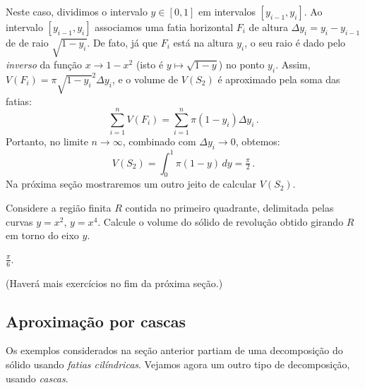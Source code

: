 \begin{ex}
\begin{center}
\begin{bmlimage}
\end{bmlimage}
\end{center}
Neste caso, dividimos o intervalo $y\in [0,1]$ em
intervalos $[y_{i-1},y_{i}]$. Ao intervalo $[y_{i-1},y_i]$ 
associamos uma fatia horizontal
$F_i$ de altura $\Delta y_i=y_i-y_{i-1}$ de
de raio $\sqrt{1-y_i}$. De fato, já que $F_i$ está na altura $y_i$, o
seu raio é dado pelo \emph{inverso} da função $x\to 1-x^2$
(isto é
$y\mapsto \sqrt{1-y}$) no ponto $y_i$. Assim, $V(F_i)=\pi \sqrt{1-y_i}^2
\Delta y_i$, e o volume de $V(S_2)$ é aproximado pela soma das fatias:
$$
\sum_{i=1}^nV(F_i)=\sum_{i=1}^n\pi(1-y_i)\Delta y_i\,.
$$
Portanto, no limite $n\to \infty$, combinado com $\Delta y_i\to 0$,
obtemos:
$$
V(S_2)=\int_0^1\pi (1-y)\,dy=\tfrac{\pi}{2}\,.
$$
Na próxima seção mostraremos um outro jeito de calcular $V(S_2)$.
\end{ex}

\begin{exo}
Considere a região finita $R$ contida no primeiro quadrante, 
delimitada pelas curvas $y=x^2$, $y=x^4$.
Calcule o volume do sólido de revolução obtido girando $R$ em torno do
eixo $y$.
\begin{sol}
$\tfrac{\pi}{6}$.
\end{sol}
\end{exo}
(Haverá mais exercícios no fim da próxima seção.)

\subsection{Aproximação por cascas}
Os exemplos considerados na seção anterior partiam de uma decomposição
do sólido usando \emph{fatias cilíndricas}.
Vejamos agora um outro tipo de decomposição, usando \emph{cascas}.

